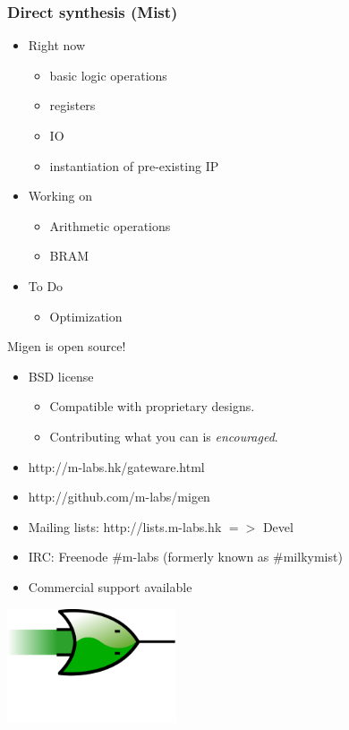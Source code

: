 \documentclass{beamer}
\newcommand\bgoff{\setbeamertemplate{background}{}}
\begin{document}
\begin{frame}
\frametitle{Direct synthesis (Mist)}
\begin{itemize}
\item Right now
\begin{itemize}
\item basic logic operations
\item registers
\item IO
\item instantiation of pre-existing IP
\end{itemize}
\item Working on
\begin{itemize}
\item Arithmetic operations
\item BRAM
\end{itemize}
\item To Do
\begin{itemize}
\item Optimization
\end{itemize}
\end{itemize}
\end{frame}

\bgoff

\begin{frame}
Migen is open source!
\begin{itemize}
\item BSD license
\begin{itemize}
\item Compatible with proprietary designs.
\item Contributing what you can is \textit{encouraged}.
\end{itemize}
\item http://m-labs.hk/gateware.html
\item http://github.com/m-labs/migen
\item Mailing lists: http://lists.m-labs.hk $=>$ Devel
\item IRC: Freenode \#m-labs (formerly known as \#milkymist)
\item Commercial support available
\end{itemize}

\centering \includegraphics[width=5cm]{migen_logo.png}

\end{frame}
\end{document}
